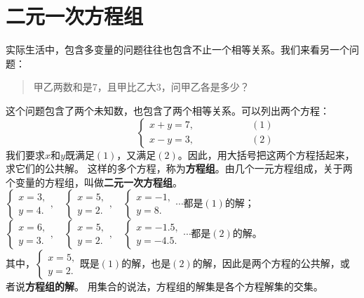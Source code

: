 \documentclass[12pt,UTF8]{ctexbook}
\begin{document}
\section{二元一次方程组}
实际生活中，包含多变量的问题往往也包含不止一个相等关系。我们来看另一个问题：
\begin{quote}
    甲乙两数和是$7$，且甲比乙大$3$，问甲乙各是多少？
\end{quote}
这个问题包含了两个未知数，也包含了两个相等关系。可以列出两个方程：
$$ \quad \quad \quad \quad \quad\left\{
\begin{array}{cr}
     x + y = 7, & \quad \quad \quad \quad \quad (1) \\
     x - y = 3, & \quad \quad \quad \quad \quad (2)
\end{array}\right.
$$
我们要求$x$和$y$既满足$(1)$，又满足$(2)$。因此，用大括号把这两个方程括起来，求它们的公共解。
这样的多个方程，称为\textbf{方程组}。由几个一元方程组成，关于两个变量的方程组，叫做\textbf{二元一次方程组}。\\
$ \left\{ \begin{array}{c}
    x = 3, \\
    y = 4.
\end{array}\right. ,\quad \left\{ \begin{array}{c}
    x = 5, \\
    y = 2.
\end{array}\right. ,\quad \left\{ \begin{array}{c}
    x = -1, \\
    y = 8.
\end{array}\right.\cdots $都是$(1)$的解；\\
$ \left\{ \begin{array}{c}
    x = 6, \\
    y = 3.
\end{array}\right. ,\quad \left\{ \begin{array}{c}
    x = 5, \\
    y = 2.
\end{array}\right. ,\quad \left\{ \begin{array}{c}
    x = -1.5, \\
    y = -4.5.
\end{array}\right.\cdots $都是$(2)$的解。\\
其中，$\left\{ \begin{array}{c}
    x = 5, \\
    y = 2.
\end{array}\right.$既是$(1)$的解，也是$(2)$的解，因此是两个方程的公共解，或者说\textbf{方程组的解}。
用集合的说法，方程组的解集是各个方程解集的交集。
\end{document}
